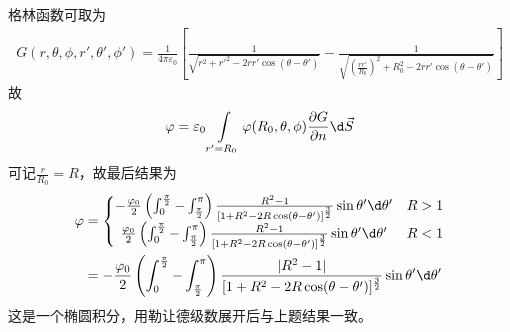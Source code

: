 \documentclass{phyasgn}
\begin{document}
\begin{sol}[7]
  格林函数可取为
  \begin{align*}
    G(r,\theta,\phi,r',\theta',\phi')=\frac{1}{4\pi\varepsilon_0}\left[\frac{1}{\sqrt{r^2+r'^2-2rr'\cos(\theta-\theta')}}-\frac{1}{\sqrt{(\frac{rr'}{R_0})^2+R_0^2-2rr'\cos(\theta-\theta')}}\right]
  \end{align*}
  故
  \begin{align*}
    \varphi=\varepsilon_0\int\limits_{r'=R_0}\varphi(R_0,\theta,\phi)\frac{\partial G}{\partial n}\d\vec{S}
  \end{align*}
  可记$\frac{r}{R_0}=R$，故最后结果为
  \begin{align*}
    \varphi&=\left\{\begin{matrix}
      -\frac{\varphi_0}{2}\left(\int_{0}^{\frac{\pi}{2}}-\int_{\frac{\pi}{2}}^{\pi}\right)\frac{R^2-1}{[1+R^2-2R\cos(\theta-\theta')]^\frac{3}{2}}\sin\theta'\d\theta'&R>1\\
      \frac{\varphi_0}{2}\left(\int_{0}^{\frac{\pi}{2}}-\int_{\frac{\pi}{2}}^{\pi}\right)\frac{R^2-1}{[1+R^2-2R\cos(\theta-\theta')]^\frac{3}{2}}\sin\theta'\d\theta'&R<1
    \end{matrix}\right.\\
    &=-\frac{\varphi_0}{2}\left(\int_{0}^{\frac{\pi}{2}}-\int_{\frac{\pi}{2}}^{\pi}\right)\frac{|R^2-1|}{[1+R^2-2R\cos(\theta-\theta')]^\frac{3}{2}}\sin\theta'\d\theta'
  \end{align*}
  这是一个椭圆积分，用勒让德级数展开后与上题结果一致。
\end{sol}
\end{document}
